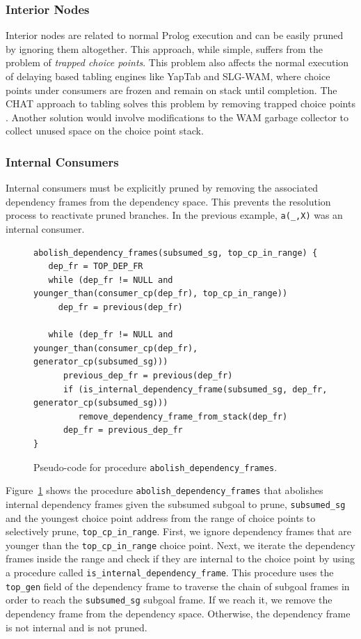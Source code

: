 \subsubsection{Interior Nodes}

Interior nodes are related to normal Prolog execution and can be easily pruned
by ignoring them altogether. This approach, while simple, suffers from the problem of \textit{trapped
choice points}. This problem also affects the normal execution of delaying based tabling engines like
YapTab and SLG-WAM, where choice points under consumers are frozen and remain on stack until completion.
The CHAT approach to tabling solves this problem by removing trapped choice points \cite{Demoen-99b}.
Another solution would involve modifications to the WAM garbage collector to collect unused space on
the choice point stack.

\subsubsection{Internal Consumers}   
   
Internal consumers must be explicitly pruned by removing the associated dependency frames from the dependency
space. This prevents the resolution process to reactivate pruned branches. In the previous example, \texttt{a(\_,X)}
was an internal consumer.

\begin{figure}[ht]
\begin{Verbatim}
abolish_dependency_frames(subsumed_sg, top_cp_in_range) {
   dep_fr = TOP_DEP_FR
   while (dep_fr != NULL and younger_than(consumer_cp(dep_fr), top_cp_in_range))
     dep_fr = previous(dep_fr)
     
   while (dep_fr != NULL and younger_than(consumer_cp(dep_fr), generator_cp(subsumed_sg)))
      previous_dep_fr = previous(dep_fr)
      if (is_internal_dependency_frame(subsumed_sg, dep_fr, generator_cp(subsumed_sg)))
         remove_dependency_frame_from_stack(dep_fr)
      dep_fr = previous_dep_fr
}
\end{Verbatim}
\caption{Pseudo-code for procedure \texttt{abolish\_dependency\_frames}.}
\label{fig:abolish_dependency_frames}
\end{figure}
   
Figure~\ref{fig:abolish_dependency_frames} shows the procedure \texttt{abolish\_dependency\_frames}
that abolishes internal dependency frames given the subsumed subgoal to prune, \texttt{subsumed\_sg} and
the youngest choice point address from the range of choice points to selectively prune, \texttt{top\_cp\_in\_range}.
First, we ignore dependency frames that are younger than the \texttt{top\_cp\_in\_range} choice point.
Next, we iterate the dependency frames inside the range and check if they are internal to the choice point
by using a procedure called \texttt{is\_internal\_dependency\_frame}. This procedure uses the \texttt{top\_gen}
field of the dependency frame to traverse the chain of subgoal frames in order to reach the \texttt{subsumed\_sg}
subgoal frame. If we reach it, we remove the dependency frame from the dependency space. Otherwise,
the dependency frame is not internal and is not pruned.

